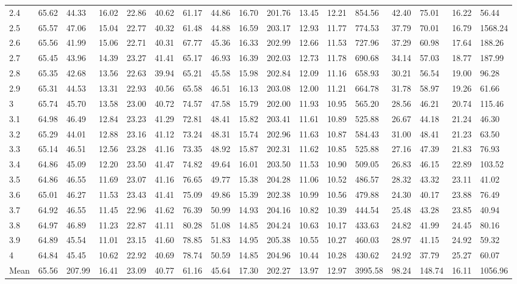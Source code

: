 \begin{adjustbox}{angle=90}
\begin{center}
{\begin{tabular}{|l|llllllllllllllll|}
2.4&65.62&44.33&16.02&22.86&40.62&61.17&44.86&16.70&201.76&13.45&12.21&854.56&42.40&75.01&16.22&56.44  \\ 
2.5&65.57&47.06&15.04&22.77&40.32&61.48&44.88&16.59&203.17&12.93&11.77&774.53&37.79&70.01&16.79&1568.24  \\ 
2.6&65.56&41.99&15.06&22.71&40.31&67.77&45.36&16.33&202.99&12.66&11.53&727.96&37.29&60.98&17.64&188.26  \\ 
2.7&65.45&43.96&14.39&23.27&41.41&65.17&46.93&16.39&202.03&12.73&11.78&690.68&34.14&57.03&18.77&187.99  \\ 
2.8&65.35&42.68&13.56&22.63&39.94&65.21&45.58&15.98&202.84&12.09&11.16&658.93&30.21&56.54&19.00&96.28  \\ 
2.9&65.31&44.53&13.31&22.93&40.56&65.58&46.51&16.13&203.08&12.00&11.21&664.78&31.78&58.97&19.26&61.66  \\ 
3&65.74&45.70&13.58&23.00&40.72&74.57&47.58&15.79&202.00&11.93&10.95&565.20&28.56&46.21&20.74&115.46  \\ 
3.1&64.98&46.49&12.84&23.23&41.29&72.81&48.41&15.82&203.41&11.61&10.89&525.88&26.67&44.18&21.24&46.30  \\ 
3.2&65.29&44.01&12.88&23.16&41.12&73.24&48.31&15.74&202.96&11.63&10.87&584.43&31.00&48.41&21.23&63.50  \\ 
3.3&65.14&46.51&12.56&23.28&41.16&73.35&48.92&15.87&202.31&11.62&10.85&525.88&27.16&47.39&21.83&76.93  \\ 
3.4&64.86&45.09&12.20&23.50&41.47&74.82&49.64&16.01&203.50&11.53&10.90&509.05&26.83&46.15&22.89&103.52  \\ 
3.5&64.86&46.55&11.69&23.07&41.16&76.65&49.77&15.38&204.28&11.06&10.52&486.57&28.32&43.32&23.11&41.02  \\ 
3.6&65.01&46.27&11.53&23.43&41.41&75.09&49.86&15.39&202.38&10.99&10.56&479.88&24.30&40.17&23.88&76.49  \\ 
3.7&64.92&46.55&11.45&22.96&41.62&76.39&50.99&14.93&204.16&10.82&10.39&444.54&25.48&43.28&23.85&40.94  \\ 
3.8&64.97&46.89&11.23&22.87&41.11&80.28&51.08&14.85&204.24&10.63&10.17&433.63&24.82&41.99&24.45&80.16  \\ 
3.9&64.89&45.54&11.01&23.15&41.60&78.85&51.83&14.95&205.38&10.55&10.27&460.03&28.97&41.15&24.92&59.32  \\ 
4&64.84&45.45&10.62&22.92&40.69&78.74&50.59&14.85&204.96&10.44&10.28&430.62&24.92&37.79&25.27&60.07  \\ \hline \hline
Mean&65.56&207.99&16.41&23.09&40.77&61.16&45.64&17.30&202.27&13.97&12.97&3995.58&98.24&148.74&16.11&1056.96  \\ \hline
\end{tabular}
    }
\end{center}
\end{adjustbox}


\newpage


